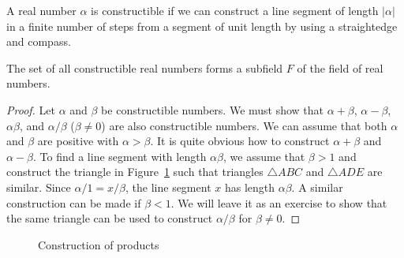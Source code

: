 A real number $\alpha$ is {\bfi constructible\/} if we can construct a line segment of length $| \alpha |$ in a
finite number of steps from a segment of unit length by using a
straightedge and compass.  
 

\begin{theorem}\label{fields:construct_num_ther}
The set of all constructible real numbers forms a subfield $F$ of the
field of real numbers. 
\end{theorem}
 
 
\begin{proof}
Let $\alpha$ and $\beta$ be constructible numbers.  We must show that
$\alpha + \beta$, $\alpha - \beta$, $\alpha \beta$, and $\alpha /
\beta$ ($\beta \neq 0$) are also constructible numbers. We can assume
that both $\alpha$ and $\beta$ are positive with $\alpha > \beta$. It
is quite obvious how to construct $\alpha + \beta$ and $\alpha -
\beta$. To find a line segment with length $\alpha \beta$, we assume
that $\beta > 1$ and construct the triangle in Figure~\ref{Multiply}
such that triangles $\triangle ABC$ and $\triangle ADE$ are similar.
Since $\alpha / 1 = x / \beta$, the line segment $x$ has length
$\alpha \beta$.  A similar construction can be made if $\beta <1$. We
will leave it as an exercise to show that the same triangle can be
used to construct $\alpha / \beta$ for $\beta \neq 0$.  
\end{proof}

\begin{figure}[htb]
\begin{center}

\end{center}
\caption{Construction of products}
\label{Multiply}
\end{figure}


